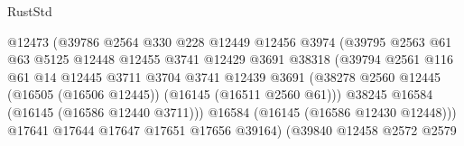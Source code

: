 \begin{lexlean}{RustStd}
\begin{coremodule}
                                        @12473
                                        (@39786
                                          @2564
                                          @330
                                          @228
                                          @12449
                                          @12456
                                          @3974
                                          (@39795
                                            @2563
                                            @61
                                            @63
                                            @5125
                                            @12448
                                            @12455
                                            @3741
                                            @12429
                                            @3691
                                            @38318
                                            (@39794
                                              @2561
                                              @116
                                              @61
                                              @14
                                              @12445
                                              @3711
                                              @3704
                                              @3741
                                              @12439
                                              @3691
                                              (@38278
                                                @2560
                                                @12445
                                                (@16505 (@16506 @12445))
                                                (@16145 (@16511 @2560 @61)))
                                              @38245
                                              @16584
                                              (@16145 (@16586 @12440 @3711)))
                                            @16584
                                            (@16145 (@16586 @12430 @12448)))
                                          @17641
                                          @17644
                                          @17647
                                          @17651
                                          @17656
                                          @39164)
                                        (@39840
                                          @12458
                                          @2572
                                          @2579

\end{coremodule}
\end{lexlean}

